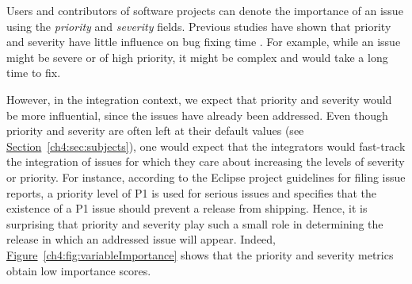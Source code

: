 \noindent{} Users and contributors of software
projects can denote the importance of an issue using the \textit{priority} and
\textit{severity} fields. Previous studies have shown that priority and
severity have little influence on bug fixing time
\cite{tian2015unreliability,Herraiz2008,Mockus:2002}. For example, while an
issue might be severe or of high priority, it might be complex and would take a
long time to fix.  

However, in the integration context, we expect that priority and severity would
be more influential, since the issues have already been addressed. Even though
priority and severity are often left at their default values (see
\hyperref[ch4:sec:subjects]{Section}~\ref{ch4:sec:subjects}), one would expect that the
integrators would fast-track the integration of issues for which they
care about increasing the levels of severity or priority. For instance,
according to the Eclipse project guidelines for filing issue reports, a priority
level of P1 is used for serious issues and specifies that the existence of a P1
issue should prevent a release from
shipping.
Hence, it is surprising that priority and severity play such a small role in
determining the release in which an addressed issue will appear. Indeed,
\hyperref[ch4:fig:variableImportance]{Figure}~\ref{ch4:fig:variableImportance} shows
that the priority and severity metrics obtain low importance scores.

